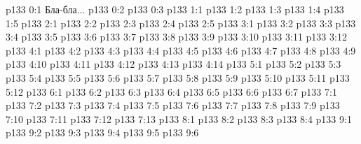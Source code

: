\author{Промежуточные создания}
\vs p133 0:1  Бла-бла...
\vs p133 0:2 \pc 
\vs p133 0:3 
\vs p133 1:1 
\vs p133 1:2 
\vs p133 1:3 
\vs p133 1:4 
\vs p133 1:5 
\vs p133 2:1 
\vs p133 2:2 
\vs p133 2:3 
\vs p133 2:4 
\vs p133 2:5 
\vs p133 3:1 
\vs p133 3:2 
\vs p133 3:3 
\vs p133 3:4 
\vs p133 3:5 
\vs p133 3:6 
\vs p133 3:7 
\vs p133 3:8 
\vs p133 3:9 
\vs p133 3:10 
\vs p133 3:11 
\vs p133 3:12 
\vs p133 4:1 
\vs p133 4:2 \pc 
\vs p133 4:3 \pc 
\vs p133 4:4 \pc 
\vs p133 4:5 \pc 
\vs p133 4:6 \pc 
\vs p133 4:7 \pc 
\vs p133 4:8 \pc 
\vs p133 4:9 \pc 
\vs p133 4:10 \pc 
\vs p133 4:11 \pc 
\vs p133 4:12 \pc 
\vs p133 4:13 \pc 
\vs p133 4:14 
\vs p133 5:1 
\vs p133 5:2 
\vs p133 5:3 
\vs p133 5:4 \pc 
\vs p133 5:5 
\vs p133 5:6 
\vs p133 5:7 
\vs p133 5:8 
\vs p133 5:9 
\vs p133 5:10 
\vs p133 5:11 \pc 
\vs p133 5:12 
\vs p133 6:1 
\vs p133 6:2 
\vs p133 6:3 
\vs p133 6:4 
\vs p133 6:5 \pc 
\vs p133 6:6 
\vs p133 6:7 
\vs p133 7:1 
\vs p133 7:2 
\vs p133 7:3 
\vs p133 7:4 
\vs p133 7:5 
\vs p133 7:6 \pc 
\vs p133 7:7 
\vs p133 7:8 
\vs p133 7:9 
\vs p133 7:10 
\vs p133 7:11 
\vs p133 7:12 
\vs p133 7:13 \pc 
{}
\vs p133 8:1 
\vs p133 8:2 
\vs p133 8:3 \pc 
\vs p133 8:4 
\vs p133 9:1 
\vs p133 9:2 
\vs p133 9:3 
\vs p133 9:4 \pc 
\vs p133 9:5 
\vs p133 9:6 \pc 
\quizlink
